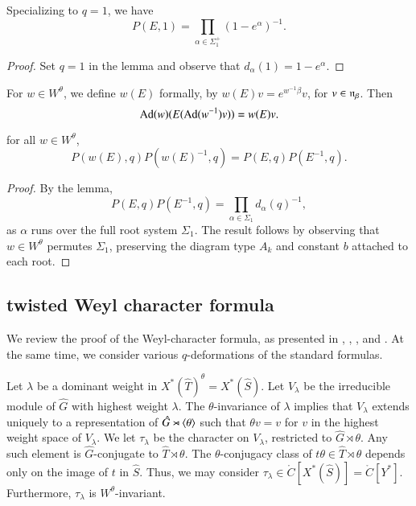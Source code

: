 \begin{corollary}\label{cor:prod1} 
Specializing to $q=1$, we have
\[
P(E,1) = \prod_{\alpha\in\Sigma^+_1} (1-e^{\alpha})^{-1}.
\]
\end{corollary}

\begin{proof}  
Set $q=1$ in the lemma and observe that $d_\alpha(1)=1-e^\alpha$.
\end{proof}

For $w\in W^\theta$, we define $w(E)$ formally, by $w(E) v = e^{
  w^{-1} \beta} v$, for $v\in {\mathfrak n}_\beta$.  Then
\[
{\operatorname{Ad}}(w)(E({\operatorname{Ad}}(w^{-1}) v)) = w(E) v.
\] 

\begin{corollary}\label{cor:weyl-p}  
for all $w\in W^\theta$,
\[
P(w(E),q) P(w(E)^{-1},q) = P(E,q)P(E^{-1},q).
\]
\end{corollary}

\begin{proof} 
By the lemma,
\[
P(E,q)P(E^{-1},q) = \prod_{\alpha\in \Sigma_1} d_{\alpha}(q)^{-1},
\]
as $\alpha$ runs over the full root system $\Sigma_1$.  The result
follows by observing that $w\in W^\theta$ permutes $\Sigma_1$,
preserving the diagram type $A_k$ and constant $b$ attached to each
root.
\end{proof}



\subsection{twisted Weyl character formula}

We review the proof of the Weyl-character formula, as presented in
\cite{kostant1961lie}, \cite{jantzen1977darstellungen},
\cite{wendt2001weyl}, and \cite{kumar2009characters}.  At the same
time, we consider various $q$-deformations of the standard formulas.

Let $\lambda$ be a dominant weight in $X^*(\hat T)^\theta = X^*(\hat
S)$.  Let $V_\lambda$ be the irreducible module of $\hat G$ with
highest weight $\lambda$.  The $\theta$-invariance of $\lambda$
implies that $V_\lambda$ extends uniquely to a representation of $\hat
G \rtimes \langle{\theta}\rangle$ such that $\theta v = v$ for $v$ in the
highest weight space of $V_\lambda$.  We let $\tau_\lambda$ be the
character on $V_\lambda$, restricted to $\hat G\rtimes\theta$.  Any
such element is $\hat G$-conjugate to $\hat T\rtimes\theta$.  The
$\theta$-conjugacy class of $t\theta\in \hat T\rtimes\theta$ depends
only on the image of $t$ in $\hat S$.  Thus, we may consider
$\tau_\lambda\in \ring{C}[X^*(\hat S)] =\ring{C}[Y^*]$.  Furthermore,
$\tau_\lambda$ is $W^\theta$-invariant.


